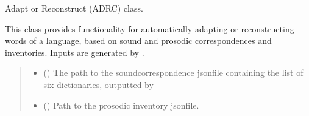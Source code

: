 \documentclass[letterpaper,10pt,english]{sphinxmanual}
\begin{document}
\begin{fulllineitems}
\label{\detokenize{documentation:loanpy.scapplier.Adrc}}
\pysigstartsignatures
{}
\pysigstopsignatures
\sphinxAtStartPar
Adapt or Reconstruct (ADRC) class.

\sphinxAtStartPar
This class provides functionality for automatically
adapting or reconstructing words of a language,
based on sound and prosodic correspondences and inventories.
Inputs are generated by .
\begin{quote}\begin{description}
\begin{itemize}
\item {} 
\sphinxAtStartPar
{} (\sphinxstyleliteralemphasis{\sphinxupquote{, }}) \textendash{} The path to the sound\sphinxhyphen{}correspondence json\sphinxhyphen{}file containing the
list of six dictionaries, outputted by

\item {} 
\sphinxAtStartPar
{} (\sphinxstyleliteralemphasis{\sphinxupquote{, }}) \textendash{} Path to the prosodic inventory json\sphinxhyphen{}file.

\end{itemize}

\end{description}\end{quote}


\end{fulllineitems}
\end{document}
